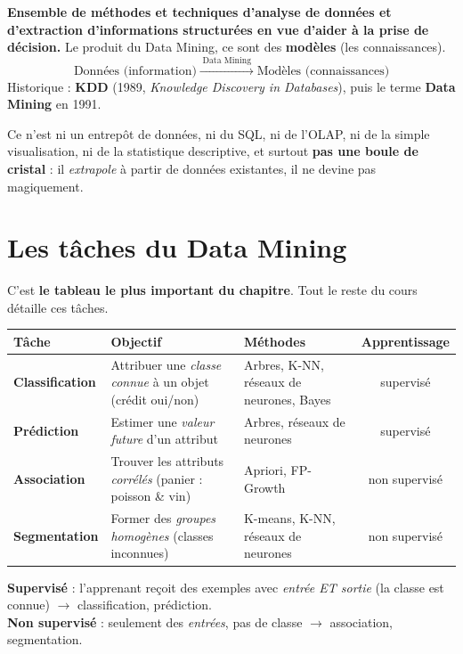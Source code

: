 \begin{Definition}
\textbf{Ensemble de méthodes et techniques d'analyse de données et d'extraction
d'informations structurées en vue d'aider à la prise de décision.}
Le \og produit \fg{} du Data Mining, ce sont des \textbf{modèles} (les connaissances).
\[ \boxed{\text{Données (information)} \;\xrightarrow{\;\text{Data Mining}\;}\; \text{Modèles (connaissances)}} \]
Historique : \textbf{KDD} (1989, \emph{Knowledge Discovery in Databases}), puis le terme
\textbf{Data Mining} en 1991.
\end{Definition}

\begin{Attention}
Ce n'est ni un entrepôt de données, ni du SQL, ni de l'OLAP, ni de la simple visualisation,
ni de la statistique descriptive, et surtout \textbf{pas une boule de cristal} : il
\emph{extrapole} à partir de données existantes, il ne devine pas magiquement.
\end{Attention}

\section{Les tâches du Data Mining}

C'est \textbf{le tableau le plus important du chapitre}. Tout le reste du cours détaille ces
tâches.

\begin{center}
\renewcommand{\arraystretch}{1.35}
\begin{tabular}{>{\bfseries}l p{6.2cm} l c}
\toprule
Tâche & Objectif & Méthodes & Apprentissage\\
\midrule
Classification & Attribuer une \emph{classe connue} à un objet (crédit oui/non) &
  Arbres, K-NN, réseaux de neurones, Bayes & supervisé\\
Prédiction & Estimer une \emph{valeur future} d'un attribut &
  Arbres, réseaux de neurones & supervisé\\
Association & Trouver les attributs \emph{corrélés} (panier : poisson \& vin) &
  Apriori, FP-Growth & non supervisé\\
Segmentation & Former des \emph{groupes homogènes} (classes inconnues) &
  K-means, K-NN, réseaux de neurones & non supervisé\\
\bottomrule
\end{tabular}
\end{center}

\begin{Definition}
\textbf{Supervisé} : l'apprenant reçoit des exemples avec \emph{entrée ET sortie} (la classe
est connue) $\rightarrow$ classification, prédiction.\\
\textbf{Non supervisé} : seulement des \emph{entrées}, pas de classe $\rightarrow$ association,
segmentation.
\end{Definition}

